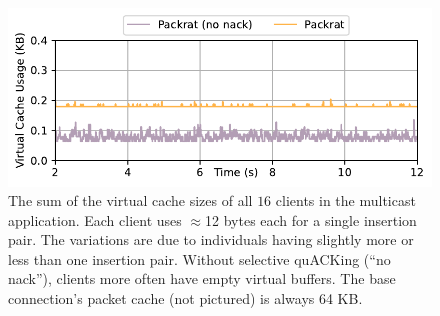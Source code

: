 \begin{figure}[t]
    \centering
    \includegraphics[width=0.8\linewidth]{packrat-paper/figures/cache_multicast.pdf}
    \caption{The sum of the virtual cache sizes of all $16$ clients in
     the multicast application. Each client uses $\approx\!$12 bytes each for a
     single insertion pair. The variations are due to individuals having
     slightly more or less than one insertion pair. Without selective quACKing
     (``no nack''), clients more often have empty virtual buffers. The base
     connection's packet cache (not pictured) is always 64 KB.}
    \label{fig:memory:multicast}
\end{figure}
